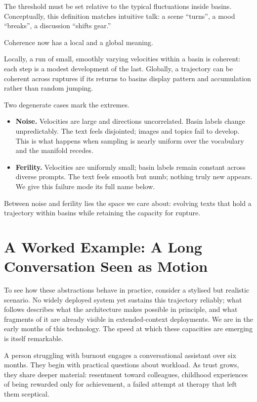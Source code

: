\documentclass[12pt,a4paper]{article}
\begin{document}
The threshold must be set relative to the typical fluctuations inside basins. Conceptually, this definition matches intuitive talk: a scene ``turns'', a mood ``breaks'', a discussion ``shifts gear.''

Coherence now has a local and a global meaning.

Locally, a run of small, smoothly varying velocities within a basin is coherent: each step is a modest development of the last. Globally, a trajectory can be coherent across ruptures if its returns to basins display pattern and accumulation rather than random jumping.

Two degenerate cases mark the extremes.

\begin{itemize}
  \item \textbf{Noise.} Velocities are large and directions uncorrelated. Basin labels change unpredictably. The text feels disjointed; images and topics fail to develop. This is what happens when sampling is nearly uniform over the vocabulary and the manifold recedes.

  \item \textbf{Ferility.} Velocities are uniformly small; basin labels remain constant across diverse prompts. The text feels smooth but numb; nothing truly new appears. We give this failure mode its full name below.
\end{itemize}

Between noise and ferility lies the space we care about: evolving texts that hold a trajectory within basins while retaining the capacity for rupture.


\section{A Worked Example: A Long Conversation Seen as Motion}

To see how these abstractions behave in practice, consider a stylised but realistic scenario. No widely deployed system yet sustains this trajectory reliably; what follows describes what the architecture makes possible in principle, and what fragments of it are already visible in extended-context deployments. We are in the early months of this technology. The speed at which these capacities are emerging is itself remarkable.

A person struggling with burnout engages a conversational assistant over six months. They begin with practical questions about workload. As trust grows, they share deeper material: resentment toward colleagues, childhood experiences of being rewarded only for achievement, a failed attempt at therapy that left them sceptical.
\end{document}

